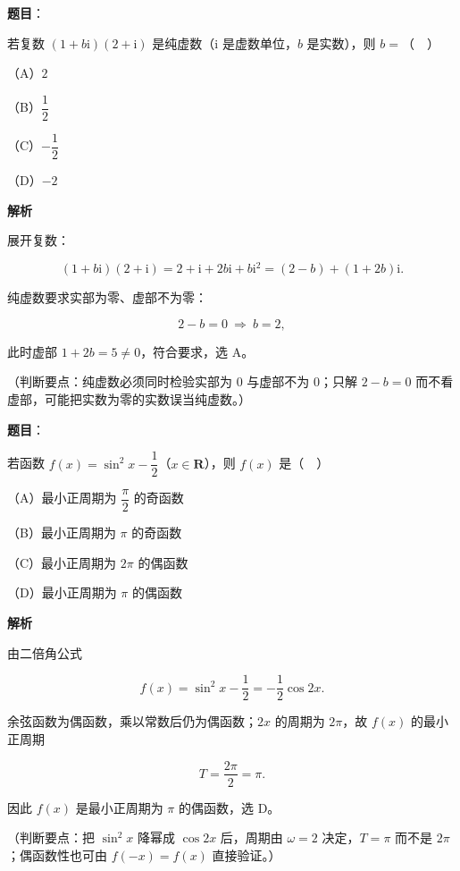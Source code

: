 \begin{answer}

\textbf{题目}：

若复数 $(1+b\mathrm i)(2+\mathrm i)$ 是纯虚数（$\mathrm i$ 是虚数单位，$b$ 是实数），则 $b=$（　）

（A）$2$

（B）$\dfrac12$

（C）$-\dfrac12$

（D）$-2$

\textbf{解析}

展开复数：

\nopagebreak[4]
\[(1+b\mathrm i)(2+\mathrm i)=2+\mathrm i+2b\mathrm i+b\mathrm i^2=(2-b)+(1+2b)\mathrm i.\]

纯虚数要求实部为零、虚部不为零：

\nopagebreak[4]
\[2-b=0\ \Rightarrow\ b=2,\]

此时虚部 $1+2b=5\neq0$，符合要求，选 A。

（判断要点：纯虚数必须同时检验实部为 $0$ 与虚部不为 $0$；只解 $2-b=0$ 而不看虚部，可能把实数为零的实数误当纯虚数。）


\end{answer}
\begin{answer}

\textbf{题目}：

若函数 $f(x)=\sin^2x-\dfrac12$（$x\in\mathbf R$），则 $f(x)$ 是（　）

（A）最小正周期为 $\dfrac{\pi}{2}$ 的奇函数

（B）最小正周期为 $\pi$ 的奇函数

（C）最小正周期为 $2\pi$ 的偶函数

（D）最小正周期为 $\pi$ 的偶函数

\textbf{解析}

由二倍角公式

\nopagebreak[4]
\[f(x)=\sin^2x-\frac12=-\frac12\cos2x.\]

余弦函数为偶函数，乘以常数后仍为偶函数；$2x$ 的周期为 $2\pi$，故 $f(x)$ 的最小正周期

\nopagebreak[4]
\[T=\frac{2\pi}{2}=\pi.\]

因此 $f(x)$ 是最小正周期为 $\pi$ 的偶函数，选 D。

（判断要点：把 $\sin^2x$ 降幂成 $\cos2x$ 后，周期由 $\omega=2$ 决定，$T=\pi$ 而不是 $2\pi$；偶函数性也可由 $f(-x)=f(x)$ 直接验证。）


\end{answer}
